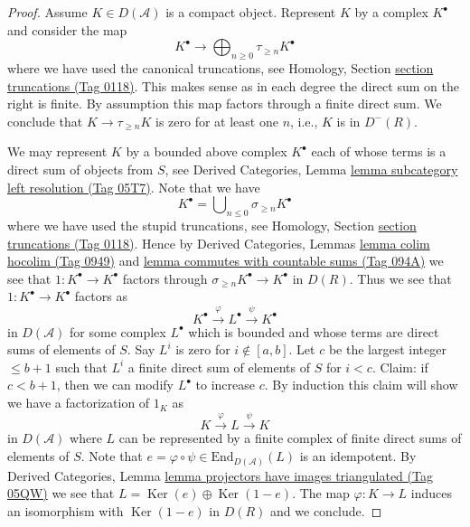 \documentclass{amsart}
\theoremstyle{plain}
\theoremstyle{definition}
\theoremstyle{remark}
\numberwithin{equation}{subsection}
\def\Ker{\mathop{\mathrm{Ker}}}
\begin{document}
\begin{proof}
Assume $K \in D(\mathcal{A})$ is a compact object. Represent $K$ by a complex
$K^\bullet$ and consider the map
$$
K^\bullet
\longrightarrow
\bigoplus\nolimits_{n \geq 0} \tau_{\geq n} K^\bullet
$$
where we have used the canonical truncations, see
Homology, Section \href{https://stacks.math.columbia.edu/tag/0118}{section truncations (Tag 0118)}.
This makes sense as in each degree the direct sum on the right is finite.
By assumption this map factors through a finite direct sum.
We conclude that $K \to \tau_{\geq n} K$ is zero for at least one $n$,
i.e., $K$ is in $D^{-}(R)$.

\medskip\noindent
We may represent $K$ by a bounded above complex $K^\bullet$ each of whose
terms is a direct sum of objects from $S$, see
Derived Categories, Lemma \href{https://stacks.math.columbia.edu/tag/05T7}{lemma subcategory left resolution (Tag 05T7)}.
Note that we have
$$
K^\bullet = \bigcup\nolimits_{n \leq 0} \sigma_{\geq n}K^\bullet
$$
where we have used the stupid truncations, see
Homology, Section \href{https://stacks.math.columbia.edu/tag/0118}{section truncations (Tag 0118)}.
Hence by Derived Categories, Lemmas \href{https://stacks.math.columbia.edu/tag/0949}{lemma colim hocolim (Tag 0949)} and
\href{https://stacks.math.columbia.edu/tag/094A}{lemma commutes with countable sums (Tag 094A)}
we see that $1 : K^\bullet \to K^\bullet$ factors through
$\sigma_{\geq n}K^\bullet \to K^\bullet$ in $D(R)$.
Thus we see that $1 : K^\bullet \to K^\bullet$ factors as
$$
K^\bullet \xrightarrow{\varphi} L^\bullet \xrightarrow{\psi} K^\bullet
$$
in $D(\mathcal{A})$ for some complex $L^\bullet$ which is bounded and
whose terms are direct sums of elements of $S$. Say $L^i$ is zero for
$i \not \in [a, b]$. Let $c$ be the largest integer $\leq b + 1$ such
that $L^i$ a finite direct sum of elements of $S$ for $i < c$.
Claim: if $c < b + 1$, then we can modify $L^\bullet$ to increase $c$.
By induction this claim will show we have a factorization
of $1_K$ as
$$
K \xrightarrow{\varphi} L \xrightarrow{\psi} K
$$
in $D(\mathcal{A})$ where $L$ can be represented by a finite
complex of finite direct sums of elements of $S$. Note that
$e = \varphi \circ \psi \in \text{End}_{D(\mathcal{A})}(L)$
is an idempotent. By Derived Categories,
Lemma \href{https://stacks.math.columbia.edu/tag/05QW}{lemma projectors have images triangulated (Tag 05QW)}
we see that $L = \Ker(e) \oplus \Ker(1 - e)$.
The map $\varphi : K \to L$ induces an isomorphism with
$\Ker(1 - e)$ in $D(R)$ and we conclude.


\end{proof}
\end{document}
